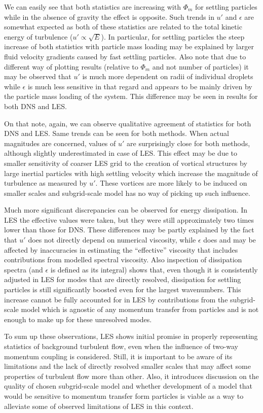 \documentclass{pracamgren}
\begin{document}
We can easily see that both statistics are increasing with $\Phi_m$ for settling particles while in the absence of gravity the effect is opposite.
Such trends in $u'$ and $\epsilon$ are somewhat expected as both of these statistics are related to the total kinetic energy of turbulence (${u' \propto \sqrt{E}}$).
In particular, for settling particles the steep increase of both statistics with particle mass loading may be explained by larger fluid velocity gradients caused by fast settling particles.
Also note that due to different way of plotting results (relative to $\Phi_m$ and not number of particles) it may be observed that $u'$ is much more dependent on radii of individual droplets while $\epsilon$ is much less sensitive in that regard and appears to be mainly driven by the particle mass loading of the system.
This difference may be seen in results for both DNS and LES.

On that note, again, we can observe qualitative agreement of statistics for both DNS and LES.
Same trends can be seen for both methods.
When actual magnitudes are concerned, values of $u'$ are surprisingly close for both methods, although slightly underestimated in case of LES.
This effect may be due to smaller sensitivity of coarser LES grid to the creation of vortical structures by large inertial particles with high settling velocity which increase the magnitude of turbulence as measured by $u'$.
These vortices are more likely to be induced on smaller scales and subgrid-scale model has no way of picking up such influence. 
 
Much more significant discrepancies can be observed for energy dissipation.
In LES the effective values were taken, but they were still approximately two times lower than those for DNS.
These differences may be partly explained by the fact that $u'$ does not directly depend on numerical viscosity, while $\epsilon$ does and may be affected by inaccuracies in estimating the ``effective'' viscosity that includes contributions from modelled spectral viscosity.
Also inspection of dissipation spectra (and $\epsilon$ is defined as its integral) shows that, even though it is consistently adjusted in LES for modes that are directly resolved, dissipation for settling particles is still significantly boosted even for the largest wavenumbers.
This increase cannot be fully accounted for in LES by contributions from the subgrid-scale model which is agnostic of any momentum transfer from particles and is not enough to make up for these unresolved modes.

To sum up these observations, LES shows initial promise in properly representing statistics of background turbulent flow, even when the influence of two-way momentum coupling is considered.
Still, it is important to be aware of its limitations and the lack of directly resolved smaller scales that may affect some properties of turbulent flow more than other.
Also, it introduces discussion on the quality of chosen subgrid-scale model and whether development of a model that would be sensitive to momentum transfer form particles is viable as a way to alleviate some of observed limitations of LES in this context.
\end{document}
